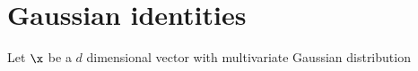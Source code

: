 
\chapter{Gaussian identities} %

\label{AppendixA} %

Let $\x$ be a $d$ dimensional vector with multivariate Gaussian distribution 
%
\begin{equation}
[\x_1, \x_2]
\end{equation}
